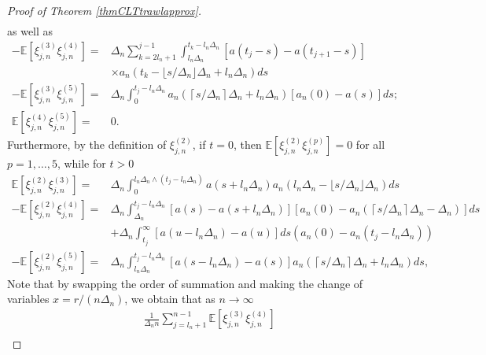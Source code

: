 \documentclass{article}
\theoremstyle{plain}
\theoremstyle{definition}
\theoremstyle{remark}
\begin{document}
\begin{appendix}
\begin{proof}[Proof of Theorem  \ref{thmCLTtrawlapprox}]
\begin{equation}
\begin{aligned}
		\end{aligned}
		\label{variance}
	\end{equation}
	as well as 
	\begin{equation}
		\begin{aligned}-\mathbb{E}[\xi_{j,n}^{(3)}\xi_{j,n}^{(4)}]= & \Delta_{n}\sum_{k=2l_{n}+1}^{j-1}\int_{l_{n}\Delta_{n}}^{t_{k}-l_{n}\Delta_{n}}\left[a(t_{j}-s)-a(t_{j+1}-s)\right]\\
			& \times a_{n}(t_{k}-\lfloor s/\Delta_{n}\rfloor\Delta_{n}+l_{n}\Delta_{n})ds\\
			-\mathbb{E}[\xi_{j,n}^{(3)}\xi_{j,n}^{(5)}]= & \Delta_{n}\int_{0}^{t_{j}-l_{n}\Delta_{n}}a_{n}(\left\lceil s/\Delta_{n}\right\rceil \Delta_{n}+l_{n}\Delta_{n})\left[a_{n}(0)-a(s)\right]ds;\\
			\mathbb{E}[\xi_{j,n}^{(4)}\xi_{j,n}^{(5)}]= & 0.
		\end{aligned}
		\label{cov3}
	\end{equation}
	Furthermore, by the definition of $\xi_{j,n}^{(2)}$, if $t=0$, then
	$\mathbb{E}[\xi_{j,n}^{(2)}\xi_{j,n}^{(p)}]=0$ for all $p=1,\ldots,5$,
	while for $t>0$
	\begin{equation}
		\begin{aligned}\mathbb{E}[\xi_{j,n}^{(2)}\xi_{j,n}^{(3)}]= & \Delta_{n}\int_{0}^{l_{n}\Delta_{n}\wedge(t_j-l_{n}\Delta_{n})}a(s+l_{n}\Delta_{n})a_{n}(l_{n}\Delta_{n}-\lfloor s/\Delta_{n}\rfloor  \Delta_{n})ds\\
			-\mathbb{E}[\xi_{j,n}^{(2)}\xi_{j,n}^{(4)}]= & \Delta_{n}\int_{\Delta_{n}}^{t_{j}-l_{n}\Delta_{n}}\left[a(s)-a(s+l_{n}\Delta_{n})\right]\left[a_{n}(0)-a_{n}(\left\lceil s/\Delta_{n}\right\rceil \Delta_{n}-\Delta_{n})\right]ds\\
			& +\Delta_{n}\int_{t_{j}}^{\infty}[a(u-l_{n}\Delta_{n})-a(u)]ds(a_{n}(0)-a_{n}(t_{j}-l_{n}\Delta_{n}))\\
			-\mathbb{E}[\xi_{j,n}^{(2)}\xi_{j,n}^{(5)}]= & \Delta_{n}\int_{l_{n}\Delta_{n}}^{t_{j}-l_{n}\Delta_{n}}\left[a(s-l_{n}\Delta_{n})-a(s)\right]a_{n}(\left\lceil s/\Delta_{n}\right\rceil \Delta_{n}+l_{n}\Delta_{n})ds,
		\end{aligned}
		\label{cov2}
	\end{equation}
	Note that by swapping the order of summation and making the change
	of variables $x=r/(n\Delta_{n})$, we obtain that as $n\rightarrow\infty$
	\begin{equation}
		\begin{aligned}
			&\frac{1}{\Delta_{n}n}\sum_{j=l_{n}+1}^{n-1}\mathbb{E}[\xi_{j,n}^{(3)}\xi_{j,n}^{(4)}]\\

\end{aligned}
\end{equation}
\end{proof}
\end{appendix}
\end{document}
